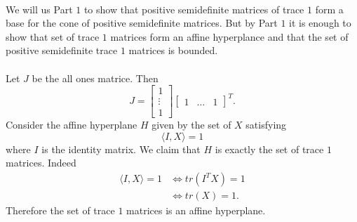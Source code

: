 \documentclass[letterpaper,12pt,oneside,onecolumn]{article}
\begin{document}
\paragraph{}
We will us Part $1$ to show that positive semidefinite matrices of trace $1$ form a base for the cone of positive semidefinite matrices. But by Part $1$ it is enough to show that set of trace $1$ matrices form an affine hyperplance and that the set of positive semidefinite trace $1$ matrices is bounded.
\paragraph{}
Let $J$ be the all ones matrice. Then $$J = \begin{bmatrix}
1 \\
\vdots \\
1
\end{bmatrix}\begin{bmatrix}
1& \hdots & 1
\end{bmatrix}^T.
$$
Consider the affine hyperplane $H$ given by the set of $X$ satisfying
$$\langle I, X \rangle = 1$$
where $I$ is the identity matrix.
We claim that $H$ is exactly the set of trace $1$ matrices. Indeed
\begin{align*}
\langle I , X \rangle = 1 &\iff tr(I^TX) = 1 \\
&\iff tr(X) = 1.
\end{align*} 
Therefore the set of trace $1$ matrices is an affine hyperplane.
\end{document}
